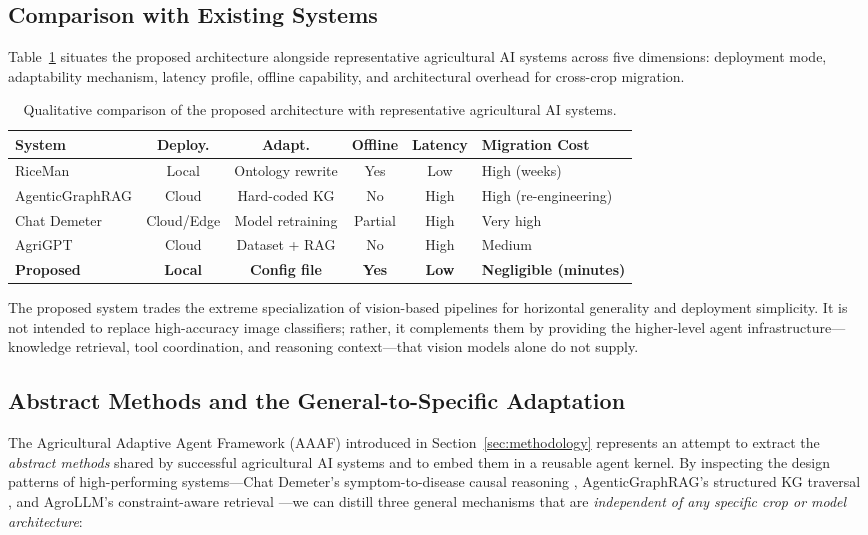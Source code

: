 \subsection{Comparison with Existing Systems}

Table~\ref{tab:comparison} situates the proposed architecture alongside representative agricultural AI systems across five dimensions: deployment mode, adaptability mechanism, latency profile, offline capability, and architectural overhead for cross-crop migration.

\begin{table}[htbp]
\centering
\caption{Qualitative comparison of the proposed architecture with representative agricultural AI systems.}
\label{tab:comparison}
\begin{tabular}{p{3.2cm}ccccp{2.8cm}}
\hline
\textbf{System} & \textbf{Deploy.} & \textbf{Adapt.} & \textbf{Offline} & \textbf{Latency} & \textbf{Migration Cost} \\
\hline
RiceMan \cite{jearanaiwongkul2021riceman} & Local & Ontology rewrite & Yes & Low & High (weeks) \\
AgenticGraphRAG \cite{agenticgraphrag2025} & Cloud & Hard-coded KG & No & High & High (re-engineering) \\
Chat Demeter \cite{chatdemeter2025} & Cloud/Edge & Model retraining & Partial & High & Very high \\
AgriGPT \cite{yang2025agrigpt} & Cloud & Dataset + RAG & No & High & Medium \\
\textbf{Proposed} & \textbf{Local} & \textbf{Config file} & \textbf{Yes} & \textbf{Low} & \textbf{Negligible (minutes)} \\
\hline
\end{tabular}
\end{table}

The proposed system trades the extreme specialization of vision-based pipelines for horizontal generality and deployment simplicity. It is not intended to replace high-accuracy image classifiers; rather, it complements them by providing the higher-level agent infrastructure---knowledge retrieval, tool coordination, and reasoning context---that vision models alone do not supply.

\subsection{Abstract Methods and the General-to-Specific Adaptation}

The Agricultural Adaptive Agent Framework (AAAF) introduced in Section~\ref{sec:methodology} represents an attempt to extract the \textit{abstract methods} shared by successful agricultural AI systems and to embed them in a reusable agent kernel. By inspecting the design patterns of high-performing systems---Chat Demeter's symptom-to-disease causal reasoning \cite{chatdemeter2025}, AgenticGraphRAG's structured KG traversal \cite{agenticgraphrag2025}, and AgroLLM's constraint-aware retrieval \cite{samuel2025agrollm}---we can distill three general mechanisms that are \textit{independent of any specific crop or model architecture}:

